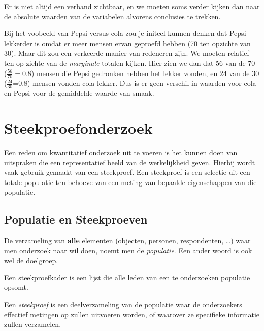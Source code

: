 Er is niet altijd een verband zichtbaar, en we moeten soms verder kijken dan naar de absolute waarden van de variabelen alvorens conclusies te trekken.


\begin{example}
  Bij het voobeeld van Pepsi versus cola zou je initeel kunnen denken dat Pepsi lekkerder is omdat er meer mensen ervan geproefd hebben (70 ten opzichte van 30). Maar dit zou een verkeerde manier van redeneren zijn. We moeten relatief ten op zichte van de  \textit{marginale} totalen kijken. Hier zien we dan dat 56 van de 70 ($\frac{56}{70} = 0.8$) mensen die Pepsi gedronken hebben het lekker vonden, en 24 van de 30 ($\frac{24}{30}$=0.8) mensen vonden cola lekker. Dus is er geen verschil in waarden voor cola en Pepsi voor de gemiddelde waarde van smaak.
\end{example}

\section{Steekproefonderzoek}
\label{sec:steekproefonderzoek}

Een reden om kwantitatief onderzoek uit te voeren is het kunnen doen van uitspraken die een representatief beeld van de werkelijkheid geven. Hierbij wordt vaak gebruik gemaakt van een steekproef. Een steekproef is een selectie uit een totale populatie ten behoeve van een meting van bepaalde eigenschappen van die populatie.

\subsection{Populatie en Steekproeven}

\begin{definition}[Populatie]
  De verzameling van \textbf{alle} elementen (objecten, personen, respondenten, \ldots) waar men onderzoek naar wil doen, noemt men de \emph{populatie}. Een ander woord is ook wel de doelgroep.
\end{definition}

\begin{definition}[Steekproefkader]
  Een steekproefkader is een lijst die alle leden van een te onderzoeken populatie opsomt.
\end{definition}

\begin{definition}[Steekproef]
  Een \emph{steekproef} is een deelverzameling van de populatie waar de onderzoekers effectief metingen op zullen uitvoeren worden, of waarover ze specifieke informatie zullen verzamelen.
\end{definition}

